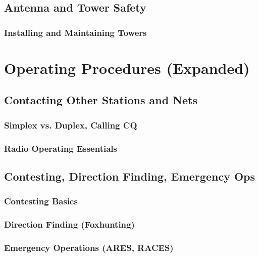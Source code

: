 \documentclass[12pt]{book}
\begin{document}
\chapter{Antenna and Tower Safety}
\section{Installing and Maintaining Towers}

\part{Operating Procedures (Expanded)}
\chapter{Contacting Other Stations and Nets}
\section{Simplex vs. Duplex, Calling CQ}

\section{Radio Operating Essentials}


\chapter{Contesting, Direction Finding, Emergency Ops}
\section{Contesting Basics}

\section{Direction Finding (Foxhunting)}

\section{Emergency Operations (ARES, RACES)}

\end{document}
